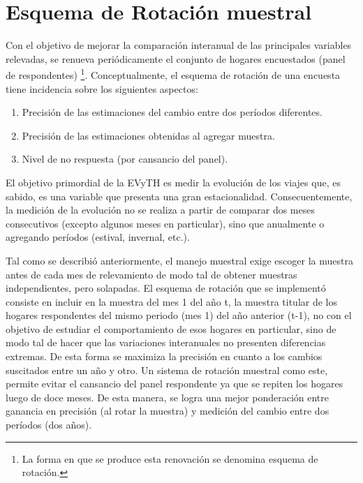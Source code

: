 \documentclass[
  openany]{book}
\begin{document}
\hypertarget{esquema-de-rotaciuxf3n-muestral}{%
\section{Esquema de Rotación muestral}\label{esquema-de-rotaciuxf3n-muestral}}

Con el objetivo de mejorar la comparación interanual de las principales variables relevadas, se renueva periódicamente el conjunto de hogares encuestados (panel de respondentes) \footnote{La forma en que se produce esta renovación se denomina esquema de rotación.}. Conceptualmente, el esquema de rotación de una encuesta tiene incidencia sobre los siguientes aspectos:

\begin{enumerate}
\def\labelenumi{\arabic{enumi}.}
\item
  Precisión de las estimaciones del cambio entre dos períodos diferentes.
\item
  Precisión de las estimaciones obtenidas al agregar muestra.
\item
  Nivel de no respuesta (por cansancio del panel).
\end{enumerate}

El objetivo primordial de la EVyTH es medir la evolución de los viajes que, es sabido, es una variable que presenta una gran estacionalidad. Consecuentemente, la medición de la evolución no se realiza a partir de comparar dos meses consecutivos (excepto algunos meses en particular), sino que anualmente o agregando períodos (estival, invernal, etc.).

Tal como se describió anteriormente, el manejo muestral exige escoger la muestra antes de cada mes de relevamiento de modo tal de obtener muestras independientes, pero solapadas. El esquema de rotación que se implementó consiste en incluir en la muestra del mes 1 del año t, la muestra titular de los hogares respondentes del mismo periodo (mes 1) del año anterior (t-1), no con el objetivo de estudiar el comportamiento de esos hogares en particular, sino de modo tal de hacer que las variaciones interanuales no presenten diferencias extremas. De esta forma se maximiza la precisión en cuanto a los cambios suscitados entre un año y otro. Un sistema de rotación muestral como este, permite evitar el cansancio del panel respondente ya que se repiten los hogares luego de doce meses. De esta manera, se logra una mejor ponderación entre ganancia en precisión (al rotar la muestra) y medición del cambio entre dos períodos (dos años).
\end{document}
